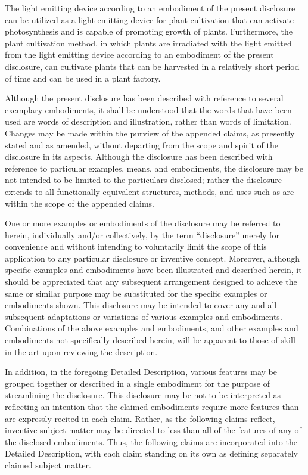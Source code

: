 \documentclass[11pt,a4paper]{article}
\begin{document}
The light emitting device according to an embodiment of the present disclosure can be utilized as a light emitting device for plant cultivation that can activate photosynthesis and is capable of promoting growth of plants. Furthermore, the plant cultivation method, in which plants are irradiated with the light emitted from the light emitting device according to an embodiment of the present disclosure, can cultivate plants that can be harvested in a relatively short period of time and can be used in a plant factory.

Although the present disclosure has been described with reference to several exemplary embodiments, it shall be understood that the words that have been used are words of description and illustration, rather than words of limitation. Changes may be made within the purview of the appended claims, as presently stated and as amended, without departing from the scope and spirit of the disclosure in its aspects. Although the disclosure has been described with reference to particular examples, means, and embodiments, the disclosure may be not intended to be limited to the particulars disclosed; rather the disclosure extends to all functionally equivalent structures, methods, and uses such as are within the scope of the appended claims.

One or more examples or embodiments of the disclosure may be referred to herein, individually and/or collectively, by the term “disclosure” merely for convenience and without intending to voluntarily limit the scope of this application to any particular disclosure or inventive concept. Moreover, although specific examples and embodiments have been illustrated and described herein, it should be appreciated that any subsequent arrangement designed to achieve the same or similar purpose may be substituted for the specific examples or embodiments shown. This disclosure may be intended to cover any and all subsequent adaptations or variations of various examples and embodiments. Combinations of the above examples and embodiments, and other examples and embodiments not specifically described herein, will be apparent to those of skill in the art upon reviewing the description.

In addition, in the foregoing Detailed Description, various features may be grouped together or described in a single embodiment for the purpose of streamlining the disclosure. This disclosure may be not to be interpreted as reflecting an intention that the claimed embodiments require more features than are expressly recited in each claim. Rather, as the following claims reflect, inventive subject matter may be directed to less than all of the features of any of the disclosed embodiments. Thus, the following claims are incorporated into the Detailed Description, with each claim standing on its own as defining separately claimed subject matter.
\end{document}
